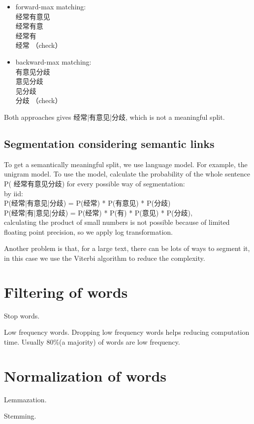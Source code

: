\documentclass{report}
\begin{document}
\begin{itemize}
	\item forward-max matching:\\
		经常有意见\\
		经常有意\\
		经常有\\
		经常 （check）
	\item backward-max matching:\\
		有意见分歧\\
		意见分歧\\
		见分歧\\
		分歧 （check）
\end{itemize}
Both approaches gives 经常|有意见|分歧, which is not a meaningful split.

\subsection{Segmentation considering semantic links}
To get a semantically meaningful split, we use language model. For example, the unigram model. To use the model, calculate the probability of the whole sentence P( 经常有意见分歧) for every possible way of segmentation: \\ 
by iid:\\
P(经常|有意见|分歧) = P(经常) * P(有意见) * P(分歧) \\
P(经常|有|意见|分歧) = P(经常) * P(有) * P(意见) * P(分歧),\\
calculating the product of small numbers is not possible because of limited floating point precision, so we apply log transformation.

Another problem is that, for a large text, there can be lots of ways to segment it, in this case we use the Viterbi algorithm to reduce the complexity.

\section{Filtering of words}
Stop words.

Low frequency words. Dropping low frequency words helps reducing computation time. Usually 80\%(a majority) of words are low frequency.

\section{Normalization of words}
Lemmazation.

Stemming.
\end{document}
